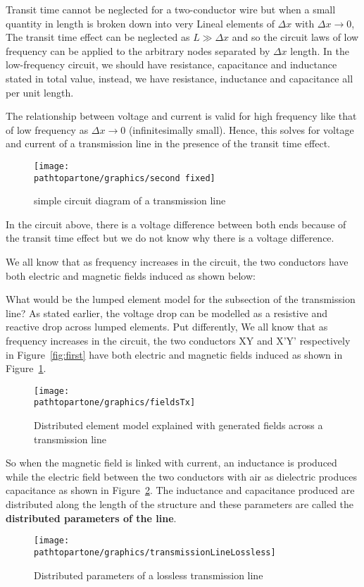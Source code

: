 Transit time cannot be neglected for a two-conductor wire but when a small quantity in length is broken down into very Lineal elements of $ \Delta x $ with  $  \Delta x \rightarrow 0 $, The transit time effect can be neglected as $ L \gg \Delta x $ and so the circuit laws of low frequency can be applied to the arbitrary nodes separated by $ \Delta x $ length. In the low-frequency circuit, we should have resistance, capacitance and inductance stated in total value, instead, we have resistance, inductance and capacitance all per unit length.

The relationship between voltage and current is valid for high frequency like that of low frequency as $ \Delta x  \rightarrow 0$ (infinitesimally small). Hence, this solves for voltage and current of a transmission line in the presence of the transit time effect.
\begin{figure}[h]
\centering
\texttt{[image: \\pathtopartone/graphics/second fixed]}
\caption{simple circuit diagram of a transmission line}
\end{figure}	

In the circuit above, there is a voltage difference between both ends because of the transit time effect but we do not know why there is a voltage difference.

We all know that as frequency increases in the circuit, the two conductors have both electric and magnetic fields induced as shown below: 

What would be the lumped element model for the subsection of the transmission line? As stated earlier, the voltage drop can be modelled as a resistive and reactive drop across lumped elements. Put differently, We all know that as frequency increases in the circuit, the two conductors XY and X'Y' respectively in Figure~\ref{fig:first} have both electric and magnetic fields induced as shown in Figure~\ref{fig:third}.
\begin{figure}[h]
\centering
\texttt{[image: \\pathtopartone/graphics/fieldsTx]}
\caption{Distributed element model explained with generated fields across a transmission line}
\label{fig:third}
\end{figure}

So when the magnetic field is linked with current, an inductance is produced while the electric field between the two conductors with air as dielectric produces capacitance as shown in Figure~\ref{fig:lossless-Tx}. The inductance and capacitance produced are distributed along the length of the structure and these parameters are called the \textbf{distributed parameters of the line}.
\begin{figure}[h]
\centering
\texttt{[image: \\pathtopartone/graphics/transmissionLineLossless]}
\caption{Distributed parameters of a lossless transmission line}
\label{fig:lossless-Tx}
\end{figure}

